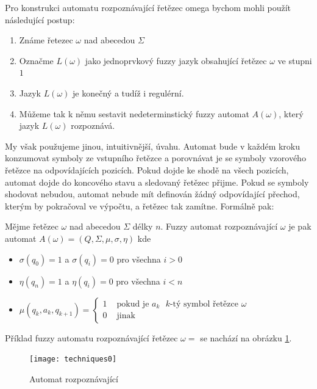 \documentclass[a4paper,10pt]{article}
\begin{document}
Pro konstrukci automatu rozpoznávající řetězec omega bychom mohli použít následující postup:
\begin{enumerate} 
 \item Známe řetezec $\omega$ nad abecedou $\Sigma$
 \item Označme $L(\omega)$ jako jednoprvkový fuzzy jazyk obsahující řetězec $\omega$ ve stupni $1$
 \item Jazyk $L(\omega)$ je konečný a tudíž i regulérní. 
 \item Můžeme tak k němu sestavit nedeterminstický fuzzy automat $A(\omega)$, který jazyk $L(\omega)$ rozpoznává.
\end{enumerate}

My však použujeme jinou, intuitivnější, úvahu. Automat bude v každém kroku konzumovat symboly ze vstupního řetězce a porovnávat je se symboly vzorového řetězce na odpovídajících pozicích. Pokud dojde ke shodě na všech pozicích, automat dojde do koncového stavu a sledovaný řetězec přijme. Pokud se symboly shodovat nebudou, automat nebude mít definován žádný odpovídající přechod, kterým by pokračoval ve výpočtu, a řetězec tak zamítne. Formálně pak:

\begin{definition} \label{def-FuzzAutRozpOme}
  Mějme řetězec $\omega$ nad abecedou $\Sigma$ délky $n$. Fuzzy automat rozpoznávající $\omega$ je pak automat $A(\omega) = ( Q, \Sigma, \mu, \sigma, \eta )$ kde
  \begin{itemize}
   \item $\sigma(q_0) = 1$ a $\sigma(q_i) = 0$ pro všechna $i > 0$
   \item $\eta(q_n) = 1$ a $\eta(q_i) = 0$ pro všechna $i < n$
   \item $\mu(q_{k}, a_k, q_{k+1}) = 
      \begin{cases}
	1		& \text{ pokud je $a_k$ $k$-tý symbol řetězce $\omega$} \\
	0		& \text{ jinak}
      \end{cases}
      $
  \end{itemize}
\end{definition}

\begin{example}
 Příklad fuzzy automatu rozpoznávající řetězec $\omega = $  se nachází na obrázku \ref{diag-AutRozpHell}.   

  \begin{figure}
    \texttt{[image: techniques0]}
    \caption{Automat rozpoznávající } \label{diag-AutRozpHell} 
  \end{figure}
\end{example}
\end{document}
